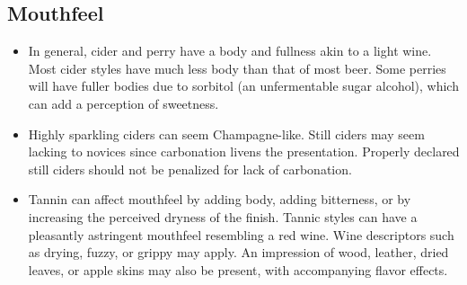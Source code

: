 \subsection*{Mouthfeel}
\begin{itemize}
\item In general, cider and perry have a body and fullness akin to a light wine. Most cider styles have much less body than that of most beer. Some perries will have fuller bodies due to sorbitol (an unfermentable sugar alcohol), which can add a perception of sweetness.
\item Highly sparkling ciders can seem Champagne-like. Still ciders may seem lacking to novices since carbonation livens the presentation. Properly declared still ciders should not be penalized for lack of carbonation.
\item Tannin can affect mouthfeel by adding body, adding bitterness, or by increasing the perceived dryness of the finish. Tannic styles can have a pleasantly astringent mouthfeel resembling a red wine. Wine descriptors such as drying, fuzzy, or grippy may apply. An impression of wood, leather, dried leaves, or apple skins may also be present, with accompanying flavor effects.
\end{itemize}